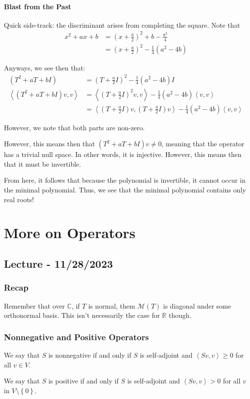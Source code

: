 \documentclass[openany]{book}
\newcommand{\CC}{\mathbb{C}}
\newcommand{\RR}{\mathbb{R}}
\newcommand{\innerproduct}[2]{\left\langle{#1}, {#2}\right\rangle}
\begin{document}
\subsubsection{Blast from the Past}
Quick side-track: the discriminant arises from completing the square. Note that
\begin{align*}
	x^{2} + ax + b &= (x + \frac{a}{2})^{2} + b - \frac{a^{2}}{4} \\
	&= (x + \frac{a}{2})^{2} - \frac{1}{4}(a^{2} - 4b)
\end{align*}

Anyways, we see then that:
\begin{align*}
	(T^{2} + aT + bI)&= (T+\frac{a}{2}I)^{2} - \frac{1}{4}(a^{2} -4b)I \\
	\innerproduct{(T^{2} + aT + bI)v}{v} &= \innerproduct{(T+\frac{a}{2}I)^{2}v}{v} - \frac{1}{4}(a^{2} - 4b) \innerproduct{v}{v} \\
	&= \innerproduct{(T+\frac{a}{2}I)v}{(T + \frac{a}{2}I)v} - \frac{1}{4}(a^{2} - 4b)\innerproduct{v}{v}
\end{align*}

However, we note that both parts are non-zero.

However, this means then that $(T^{2} + aT + bI)v \neq 0$, meaning that the operator has a trivial null space. In other words, it is injective. However, this means then that it must be invertible.

From here, it follows that because the polynomial is invertible, it cannot occur in the minimal polynomial. Thus, we see that the minimal polynomial contains only real roots!

\chapter{More on Operators}
\section{Lecture - 11/28/2023}
\subsection{Recap}
Remember that over $\CC$, if $T$ is normal, them $\mathcal{M}(T)$ is diagonal under some orthonormal basis. This isn't necessarily the case for $\RR$ though.

\subsection{Nonnegative and Positive Operators}
\begin{defn}
	We say that $S$ is nonnegative if and only if $S$ is self-adjoint and $\innerproduct{Sv}{v} \geq 0$ for all $v \in V$.
\end{defn}
\begin{defn}
	We say that $S$ is positive if and only if $S$ is self-adjoint and $\innerproduct{Sv}{v} > 0$ for all $v$ in $V \setminus \left\{  0 \right\}$.
\end{defn}
\end{document}

